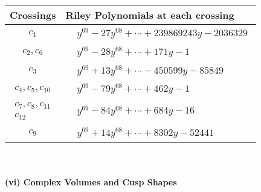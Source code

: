 \documentclass[1p]{elsarticle_modified}
\theoremstyle{definition}
\begin{document}
\begin{tabular}{m{50pt}|m{274pt}}
Crossings & \hspace{64pt}Riley Polynomials at each crossing \\
\hline $$\begin{aligned}c_{1}\end{aligned}$$&$\begin{aligned}
&y^{69}-27 y^{68}+\cdots+239869243 y-2036329
\end{aligned}$\\
\hline $$\begin{aligned}c_{2},c_{6}\end{aligned}$$&$\begin{aligned}
&y^{69}-28 y^{68}+\cdots+171 y-1
\end{aligned}$\\
\hline $$\begin{aligned}c_{3}\end{aligned}$$&$\begin{aligned}
&y^{69}+13 y^{68}+\cdots-450599 y-85849
\end{aligned}$\\
\hline $$\begin{aligned}c_{4},c_{5},c_{10}\end{aligned}$$&$\begin{aligned}
&y^{69}-79 y^{68}+\cdots+462 y-1
\end{aligned}$\\
\hline $$\begin{aligned}c_{7},c_{8},c_{11}\\c_{12}\end{aligned}$$&$\begin{aligned}
&y^{69}-84 y^{68}+\cdots+684 y-16
\end{aligned}$\\
\hline $$\begin{aligned}c_{9}\end{aligned}$$&$\begin{aligned}
&y^{69}+14 y^{68}+\cdots+8302 y-52441
\end{aligned}$\\
\hline
\end{tabular}\\~\\
\newpage\flushleft \textbf{(vi) Complex Volumes and Cusp Shapes}
\end{document}
